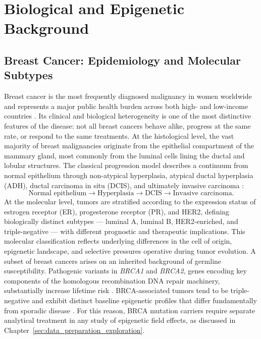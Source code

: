 \chapter{Biological and Epigenetic Background}
\label{chap:biological_background}

\section{Breast Cancer: Epidemiology and Molecular Subtypes}

Breast cancer is the most frequently diagnosed malignancy in women worldwide and
represents a major public health burden across both high- and low-income countries
\cite{Hanahan2011}. Its clinical and biological heterogeneity is one of the most
distinctive features of the disease: not all breast cancers behave alike, progress
at the same rate, or respond to the same treatments.
At the histological level, the vast majority of breast malignancies originate from
the epithelial compartment of the mammary gland, most commonly from the luminal
cells lining the ductal and lobular structures. The classical progression model
describes a continuum from normal epithelium through non-atypical hyperplasia,
atypical ductal hyperplasia (ADH), ductal carcinoma in situ (DCIS), and ultimately
invasive carcinoma \cite{Hanahan2000}:
\[
\text{Normal epithelium} \rightarrow
\text{Hyperplasia} \rightarrow
\text{DCIS} \rightarrow
\text{Invasive carcinoma}.
\]
At the molecular level, tumors are stratified according to the expression status of
estrogen receptor (ER), progesterone receptor (PR), and HER2, defining biologically
distinct subtypes — luminal A, luminal B, HER2-enriched, and triple-negative — with
different prognostic and therapeutic implications. This molecular classification
reflects underlying differences in the cell of origin, epigenetic landscape, and
selective pressures operative during tumor evolution.
A subset of breast cancers arises on an inherited background of germline susceptibility.
Pathogenic variants in \textit{BRCA1} and \textit{BRCA2}, genes encoding key
components of the homologous recombination DNA repair machinery, substantially
increase lifetime risk \cite{brca_factsheet}. BRCA-associated tumors tend to be
triple-negative and exhibit distinct baseline epigenetic profiles that differ
fundamentally from sporadic disease \cite{Suijkerbuijk2008,Bartlett2022}.
For this reason, BRCA mutation carriers require separate analytical treatment in
any study of epigenetic field effects, as discussed in Chapter~\ref{sec:data_preparation_exploration}.

